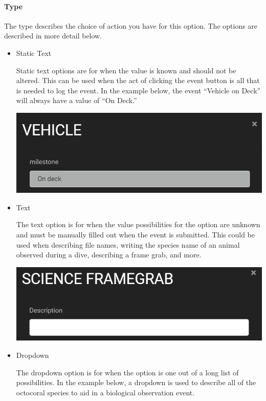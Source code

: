 \documentclass[
  letterpaper,
  DIV=11,
  numbers=noendperiod]{scrreprt}
\let\oldparagraph\paragraph
\renewcommand{\paragraph}[1]{\oldparagraph{#1}\mbox{}}
\begin{document}
\hypertarget{type}{%
\paragraph{Type}\label{type}}

The type describes the choice of action you have for this option. The
options are described in more detail below.

\begin{itemize}
\item
  Static Text

  Static text options are for when the value is known and should not be
  altered. This can be used when the act of clicking the event button is
  all that is needed to log the event. In the example below, the event
  ``Vehicle on Deck'' will always have a value of ``On Deck.''

  \includegraphics{images/image15.png}
\item
  Text

  The text option is for when the value possibilities for the option are
  unknown and must be manually filled out when the event is submitted.
  This could be used when describing file names, writing the species
  name of an animal observed during a dive, describing a frame grab, and
  more.

  \includegraphics{images/image10.png}
\item
  Dropdown

  The dropdown option is for when the option is one out of a long list
  of possibilities. In the example below, a dropdown is used to describe
  all of the octocoral species to aid in a biological observation event.


\end{itemize}
\end{document}
